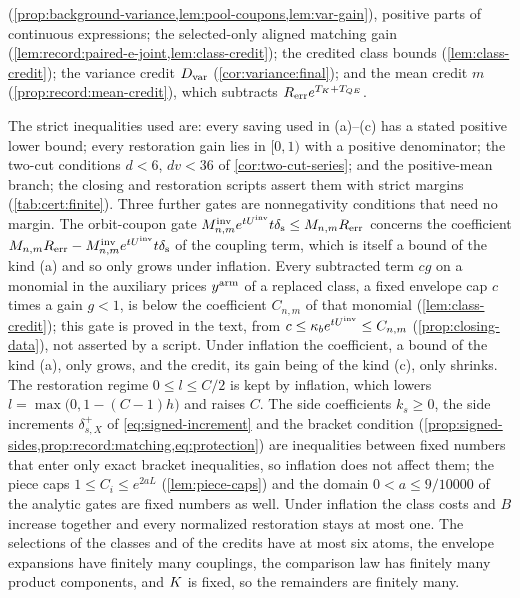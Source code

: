 \begin{remark}
\begin{enumerate}[label=(\alph*)]
 (\cref{prop:background-variance,lem:pool-coupons,lem:var-gain}), positive
 parts of continuous expressions; the selected-only aligned matching gain
 (\cref{lem:record:paired-e-joint,lem:class-credit}); the credited class
 bounds (\cref{lem:class-credit}); the variance credit $D_{\rm var}$
 (\cref{cor:variance:final}); and the mean credit $m$
 (\cref{prop:record:mean-credit}), which subtracts $R_{\rm
 err}e^{T_K+T_{QE}}$.
\end{enumerate}
The strict inequalities used are: every saving used in (a)--(c) has a stated positive lower bound; every restoration gain lies in $[0,1)$ with a positive denominator; the
two-cut conditions $d<6$, $dv<36$ of \cref{cor:two-cut-series}; and the
positive-mean branch; the closing and restoration scripts assert them with
strict margins (\cref{tab:cert:finite}). Three further gates are
nonnegativity conditions that need no margin. The orbit-coupon gate
$M^{\rm inv}_{n,m}e^{tU^{\mathrm{inv}}}t\delta_{\rm s}\le M_{n,m}R_{\rm err}$ concerns the
coefficient $M_{n,m}R_{\rm err}-M^{\rm inv}_{n,m}e^{tU^{\mathrm{inv}}}t\delta_{\rm s}$ of
the coupling term, which is itself a bound of the kind (a) and so only grows
under inflation. Every subtracted term $cg$ on a monomial in the auxiliary prices $y^{\rm arm}$ of a replaced class,
a fixed envelope cap $c$ times a gain $g<1$, is below the coefficient
$C_{n,m}$ of that monomial (\cref{lem:class-credit}); this gate is proved in
the text, from $c\le\kappa_be^{tU^{\mathrm{inv}}}\le C_{n,m}$ (\cref{prop:closing-data}),
not asserted by a script. Under inflation the coefficient, a bound of the kind
(a), only grows, and the credit, its gain being of the kind (c), only shrinks.
The restoration regime $0\le l\le C/2$ is kept by inflation, which lowers
$l=\max\bigl(0,1-(C-1)h\bigr)$ and raises $C$. The side coefficients
$k_s\ge0$, the side increments $\delta^+_{s,X}$ of \eqref{eq:signed-increment} and the bracket condition (\cref{prop:signed-sides,prop:record:matching,eq:protection})
are inequalities between fixed numbers that enter only exact bracket
inequalities, so inflation does not affect them; the piece caps
$1\le C_i\le e^{2aL}$ (\cref{lem:piece-caps}) and the domain $0<a\le9/10000$
of the analytic gates are fixed numbers as well. Under inflation the class
costs and $B$ increase together and every normalized restoration stays at
most one. The selections of the classes and of the credits have at most six
atoms, the envelope expansions have finitely many couplings, the comparison
law has finitely many product components, and $K$ is fixed, so the
remainders are finitely many.
\end{remark}

